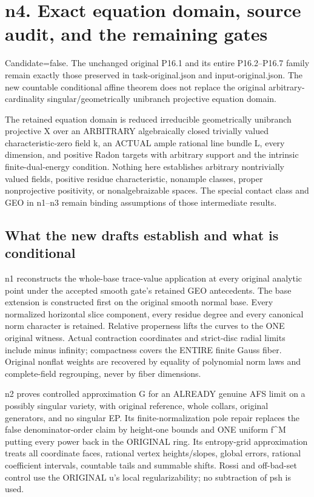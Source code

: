 \documentclass[
  10pt,
]{article}
\begin{document}
\section{n4. Exact equation domain, source audit, and the remaining
gates}\label{n4.-exact-equation-domain-source-audit-and-the-remaining-gates}

Candidate=false. The unchanged original P16.1 and its entire
P16.2--P16.7 family remain exactly those preserved in task-original.json
and input-original.json. The new countable conditional affine theorem
does not replace the original arbitrary-cardinality
singular/geometrically unibranch projective equation domain.

The retained equation domain is reduced irreducible geometrically
unibranch projective X over an ARBITRARY algebraically closed trivially
valued characteristic-zero field k, an ACTUAL ample rational line bundle
L, every dimension, and positive Radon targets with arbitrary support
and the intrinsic finite-dual-energy condition. Nothing here establishes
arbitrary nontrivially valued fields, positive residue characteristic,
nonample classes, proper nonprojective positivity, or nonalgebraizable
spaces. The special contact class and GEO in n1--n3 remain binding
assumptions of those intermediate results.

\subsection{What the new drafts establish and what is
conditional}\label{what-the-new-drafts-establish-and-what-is-conditional}

n1 reconstructs the whole-base trace-value application at every original
analytic point under the accepted smooth gate's retained GEO
antecedents. The base extension is constructed first on the original
smooth normal base. Every normalized horizontal slice component, every
residue degree and every canonical norm character is retained. Relative
properness lifts the curves to the ONE original witness. Actual
contraction coordinates and strict-disc radial limits include minus
infinity; compactness covers the ENTIRE finite Gauss fiber. Original
nonflat weights are recovered by equality of polynomial norm laws and
complete-field regrouping, never by fiber dimensions.

n2 proves controlled approximation G for an ALREADY genuine AFS limit on
a possibly singular variety, with original reference, whole collars,
original generators, and no singular EP. Its finite-normalization pole
repair replaces the false denominator-order claim by height-one bounds
and ONE uniform f\^{}M putting every power back in the ORIGINAL ring.
Its entropy-grid approximation treats all coordinate faces, rational
vertex heights/slopes, global errors, rational coefficient intervals,
countable tails and summable shifts. Rossi and off-bad-set control use
the ORIGINAL u's local regularizability; no subtraction of psh is used.
\end{document}
